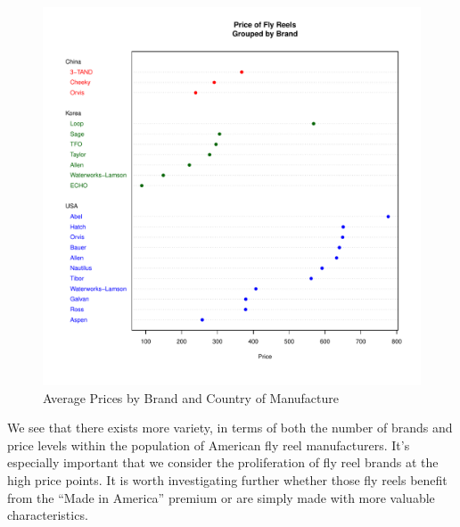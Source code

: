 \documentclass[11pt]{book}
\begin{document}
\begin{figure}[h!]
  \centering
  \includegraphics[scale = 0.5, keepaspectratio=true]{../Figures/dotchart_brand_country}
  \caption{Average Prices by Brand and Country of Manufacture} \label{fig:dotchart_brand_country}
\end{figure}

We see that there exists more variety, 
in terms of both the number of brands and price levels
within the population of American fly reel manufacturers. 
It's especially important that we consider the proliferation of 
fly reel brands at the high price points.
It is worth investigating further whether those fly reels
benefit from the ``Made in America'' premium
or are simply made with more valuable characteristics. 


\end{document}
